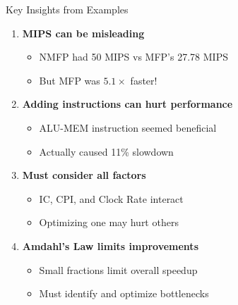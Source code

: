 \documentclass[aspectratio=169,12pt]{beamer}
\begin{document}
\begin{frame}{Key Insights from Examples}
\begin{enumerate}
    \item \textbf{MIPS can be misleading}
    \begin{itemize}
        \item NMFP had 50 MIPS vs MFP's 27.78 MIPS
        \item But MFP was $5.1\times$ faster!
    \end{itemize}
    
    \item \textbf{Adding instructions can hurt performance}
    \begin{itemize}
        \item ALU-MEM instruction seemed beneficial
        \item Actually caused 11\% slowdown
    \end{itemize}
    
    \item \textbf{Must consider all factors}
    \begin{itemize}
        \item IC, CPI, and Clock Rate interact
        \item Optimizing one may hurt others
    \end{itemize}
    
    \item \textbf{Amdahl's Law limits improvements}
    \begin{itemize}
        \item Small fractions limit overall speedup
        \item Must identify and optimize bottlenecks
    \end{itemize}
\end{enumerate}
\end{frame}
\end{document}
